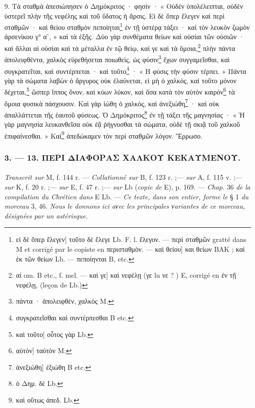 \documentclass[landscape, a4paper, 11pt, oneside, polutonikogreek, french]{article}
\begin{document}
9. Τὰ σταθμὰ ἀπεσιώπησεν ὁ Δημόκριτος · φησίν · « Οὺδὲν ὑπολέλειπται, οὐδὲν ὑστερεῖ πλὴν τῆς νεφέλης καὶ τοῦ ὕδατος ἡ ἄρσις. Εἰ δὲ ὅπερ ἔλεγεν καὶ περὶ σταθμῶν · καὶ θείου σταθμὸν πεποίηται\footnote{εἰ δὲ ὅπερ ἔλεγεν] τοῦτο δὲ ἔλεγε Lb. F. l. ἔλεγον. --- περὶ σταθμῶν gratté dans M et corrigé par le copiste en περισταθμὸν. --- καὶ θείου] και θείων BAK ; καὶ ἐκ τῶν θείων Lb. --- πεποίηνται B, etc.} ἐν τῇ ὑστέρᾳ τάξει · καὶ τὸν λευκὸν ζωμὸν ἀρσενίκου γ° αʹ, » καὶ τὰ ἑξῆς. Δύο γὰρ συνθέματα θείων καὶ οὐσίαι τῶν οὐσιῶν · καὶ ἄλλαι αἱ οὐσίαι καὶ τὰ μέταλλα ἐν τῷ θείῳ, καί γε καὶ τὰ ὅμοια,\footnote{αἱ om. B etc., f. mel. --- καί γε] καὶ νεφέλῃ (γε lu νε ? ) E, corrigé en ἐν τῇ νεφέλῃ, (leçon de Lb.)} πλὴν πάντα ἀπολειφθέντα, χαλκὸς εὑρεθήσεται ποιωθεὶς, ὡς φύσιν\footnote{πάντα · ἀπολειφθὲν, χαλκὸς M.} ἔχων συγγαμεῖσθαι, καὶ συγκρατεῖται, καὶ συντέρπεται · καὶ τοῦτο\footnote{συγκρατεῖσθαι καὶ συντέρπεσθαι B etc.} · « Η φύσις τὴν φύσιν τέρπει. » Πάντα γὰρ τὰ σώματα λαβὼν ὁ ἄργυρος οὐκ ἐλαύνεται, εἰ μὴ ὁ χαλκὸς, καὶ τοῦτο μόνον δέχεται,\footnote{καὶ τοῦτο] οὗτος γὰρ Lb.} ὥσπερ ἵππος ὄνον, καὶ κύων λύκον, καὶ ὅσα κατὰ τὸν αὐτὸν καιρὸν\footnote{αὐτὸν] ταὐτὸν M.} τὰ ὅμοια φυσικὰ πάσχουσιν. Καὶ γὰρ ἰώθη ὁ χαλκὸς, καὶ ἀνεξιώθη\footnote{ἀνεξιώθη] ἐξιώθη B etc.} · καὶ οὐκ ἀπαλλάττεται τῆς ἑαυτοῦ φύσεως. Ὁ Δημόκριτος\footnote{ὁ Δημ. δὲ Lb.} ἐν τῇ τάξει τῆς μαγνησίας · « Ἡ γὰρ μαγνησία λευκανθεῖσα οὐκ ἐᾷ ῥήγνυσθαι τὰ σώματα, οὐδὲ τῇ σκιᾷ τοῦ χαλκοῦ ἐπιφαίνεσθαι. » Καὶ\footnote{καὶ οὕτως ἀπεδ. Lb.} ἀπεδώκαμεν τὸν περὶ σταθμῶν λόγον. Ἔρρωσο.

\bigskip
\centerline{\EightStarTaper}
\centerline{\EightStarTaper\EightStarTaper}
\bigskip

\subsubsection{3. --- 13. ΠΕΡΙ ΔΙΑΦΟΡΑΣ ΧΑΛΚΟΥ ΚΕΚΑΥΜΕΝΟΥ.}
\paragraph{}
\emph{Transcrit sur} M, f. 144 r. --- \emph{Collationné sur} B, f. 123 r. ;--- \emph{sur} A, f. 115 v. ;--- \emph{sur} K, f. 20 r. ;--- \emph{sur} E, f. 47 r. ;--- \emph{sur} Lb (\emph{copie de} E), p. 169. --- \emph{Chap.} 36 \emph{de la compilation du Chrétien dans} E Lb. --- \emph{Ce texte, dans son entier, forme le} § 1 \emph{du morceau} 3, 46. \emph{Nous le donnons ici aνec les principales νariantes de ce morceau, désignées par un astérisque}.
\end{document}
